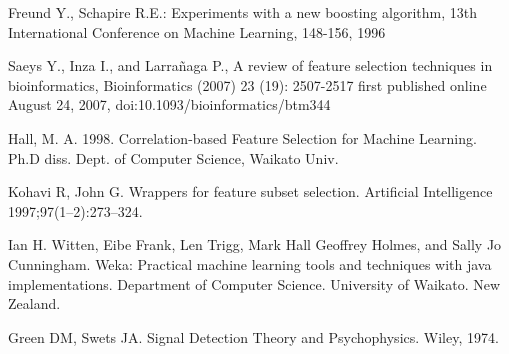 \documentclass[conference,a4paper]{IEEEtran}
\begin{document}
\begin{thebibliography}{1}
	 Freund Y., Schapire R.E.: Experiments with a new boosting algorithm, 13th International Conference on Machine Learning, 148-156, 1996
	
	 Saeys Y., Inza I., and Larra\~naga P., A review of feature selection techniques in bioinformatics, Bioinformatics (2007) 23 (19): 2507-2517 first published online August 24, 2007, doi:10.1093/bioinformatics/btm344
	
	 Hall, M. A. 1998. Correlation-based Feature Selection for Machine Learning. Ph.D diss. Dept. of Computer Science, Waikato Univ.
	
	Kohavi R, John G. Wrappers for feature subset selection. Artificial Intelligence 1997;97(1–2):273–324.
	
	 Ian H. Witten, Eibe Frank, Len Trigg, Mark Hall Geoffrey Holmes, and Sally Jo Cunningham. Weka: Practical machine learning tools and techniques with java implementations. Department of Computer Science. University of Waikato. New Zealand.
	
	 Green DM, Swets JA. Signal Detection Theory and Psychophysics. Wiley, 1974.
	
	
\end{thebibliography}
\end{document}

